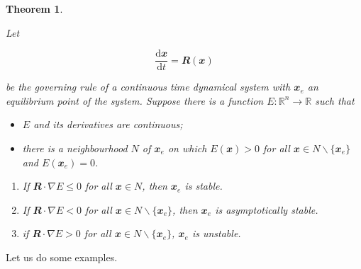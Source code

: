 \documentclass[
  a4paper,
  oneside,
  final]{krantz}
\providecommand{\tightlist}{%
  \setlength{\itemsep}{0pt}\setlength{\parskip}{0pt}}
\newcommand{\R}{\mathbb{R}}
\renewcommand{\d}{\mathrm{d}}
\renewcommand{\v}[1]{{\mathbfit{#1}}}
\newcommand{\der}[2]{\dfrac{\d #1}{\d #2}}
\newtheorem{theorem}{Theorem}[chapter]
\theoremstyle{definition}
\theoremstyle{definition}
\theoremstyle{definition}
\theoremstyle{definition}
\theoremstyle{remark}
\begin{document}
\begin{theorem}
\protect\hypertarget{thm:Lyapunov-stability-strong}{}\label{thm:Lyapunov-stability-strong}

Let

\[ \der{\v{x}}{t} = \v{R}(\v{x})\]

be the governing rule of a continuous time dynamical system with \(\v{x}_{e}\) an equilibrium point of the system.
Suppose there is a function \(E: \R^{n} \to \R\) such that

\begin{itemize}
\tightlist
\item
  \(E\) and its derivatives are continuous;
\item
  there is a neighbourhood \(N\) of \(\v{x}_{e}\) on which \(E(\v{x}) > 0\) for all \(\v{x} \in N \backslash \{\v{x}_{e}\}\) and \(E(\v{x}_e) = 0\).
\end{itemize}

\begin{enumerate}
\def\labelenumi{\roman{enumi}.}
\tightlist
\item
  If \(\v{R}\cdot \nabla E \le 0\) for all \(\v{x} \in N\), then \(\v{x}_e\) is stable.
\item
  If \(\v{R}\cdot \nabla E < 0\) for all \(\v{x} \in N \backslash \{\v{x}_{e}\}\), then \(\v{x}_e\) is asymptotically stable.
\item
  if \(\v{R}\cdot \nabla E >0\) for all \(\v{x} \in N \backslash \{\v{x}_{e}\}\), \(\v{x}_e\) is unstable.
\end{enumerate}

\end{theorem}

Let us do some examples.
\end{document}
